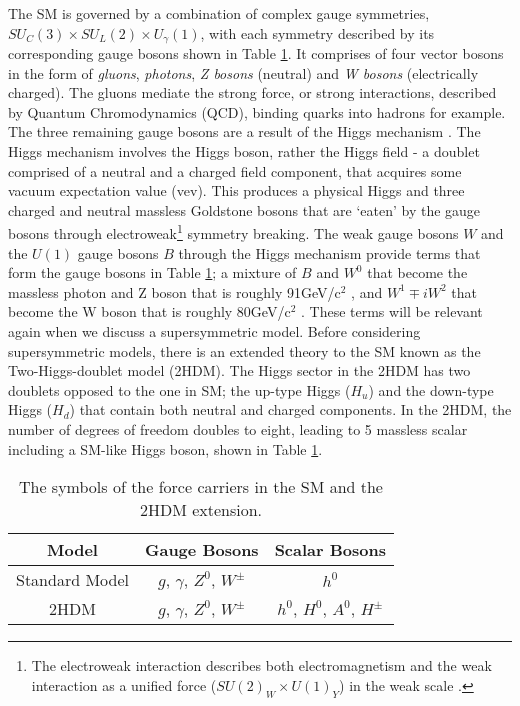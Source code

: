 The SM is governed by a combination of complex gauge symmetries, $SU_C(3)\times SU_L(2) \times U_\gamma(1)$, with each symmetry described by its corresponding gauge bosons shown in Table \ref{tab:SMBos}. It comprises of four vector bosons in the form of \textit{gluons}, \textit{photons}, \textit{Z bosons} (neutral) and \textit{W bosons} (electrically charged). The gluons mediate the strong force, or strong interactions, described by Quantum Chromodynamics (QCD), binding quarks into hadrons for example. The three remaining gauge bosons are a result of the Higgs mechanism \cite{higgs1964broken, englert1964broken}. The Higgs mechanism involves the Higgs boson, rather the Higgs field - a doublet comprised of a neutral and a charged field component, that acquires some vacuum expectation value (vev). This produces a physical Higgs and three charged and neutral massless Goldstone bosons that are `eaten' by the gauge bosons through electroweak\footnote{The electroweak interaction describes both electromagnetism and the weak interaction as a unified force  ($SU(2)_W \times U(1)_Y$) in the weak scale \cite{thomson2013modern}.} symmetry breaking. The weak gauge bosons $W$ and the $U(1)$ gauge bosons $B$ through the Higgs mechanism provide terms that form the gauge bosons in Table \ref{tab:SMBos}; a mixture of $B$ and $W^0$ that become the massless photon and Z boson that is roughly 91GeV/c$^2$ \cite{tanabashi2018review}, and $W^1 \mp iW^2$ that become the W boson that is roughly 80GeV/c$^2$ \cite{tanabashi2018review}. These terms will be relevant again when we discuss a supersymmetric model. Before considering supersymmetric models, there is an extended theory to the SM known as the Two-Higgs-doublet model (2HDM).  The Higgs sector in the 2HDM has two doublets opposed to the one in SM; the up-type Higgs ($H_u$) and the down-type Higgs ($H_d$) that contain both neutral and charged components. In the 2HDM, the number of degrees of freedom doubles to eight, leading to 5 massless scalar including a SM-like Higgs boson, shown in Table \ref{tab:SMBos}.  \\

\begin{table}[htbp]
    \centering
    {\renewcommand{\arraystretch}{1.2}
    \begin{tabular}{c||c|c}
    \toprule
    Model & Gauge Bosons  & Scalar Bosons \\
    \midrule
    Standard Model & $g$, $\gamma$, $Z^0$, $W^\pm$ & $h^0$ \\
    \hline
    2HDM & $g$, $\gamma$, $Z^0$, $W^\pm$ & $h^0$, $H^0$, $A^0$, $H^\pm$ \\
    \bottomrule
    \end{tabular}}
    \caption{The symbols of the force carriers in the SM and the 2HDM extension.}
    \label{tab:SMBos}
\end{table}


